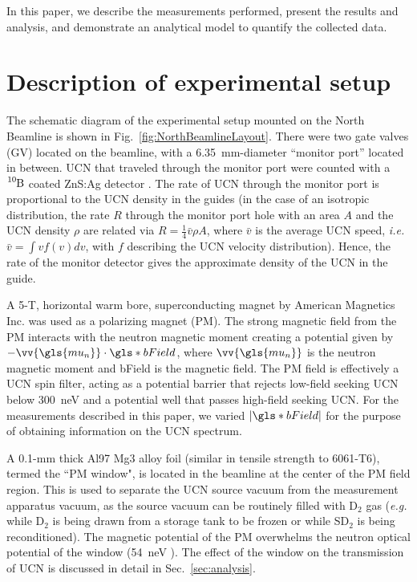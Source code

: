 In this paper, we describe the measurements performed, present the results and analysis, and demonstrate an analytical model to quantify the collected data. 


\section{\label{sec:experimentalSetup}Description of experimental setup}


The schematic diagram of the experimental setup mounted on the North Beamline is shown in Fig.~\ref{fig:NorthBeamlineLayout}. There were two gate valves (GV) located on the beamline, with a \qty{6.35}{\mm}-diameter ``monitor port'' located in between. UCN that traveled through the monitor port were counted with a $\ce{^{10}B}$ coated ZnS:Ag detector \cite{jeph_b10_2011}. The rate of UCN through the monitor port is proportional to the UCN density in the guides (in the case of an isotropic distribution, the rate $R$ through the monitor port hole with an area $A$ and the UCN density $\rho$ are related via  $R = \frac{1}{4} \bar{v} \rho A$, where $\bar{v}$ is the average UCN speed, {\it i.e.} $\bar{v} = \int vf(v)dv$, with $f$ describing the UCN velocity distribution). Hence, the rate of the monitor detector gives the approximate density of the UCN in the guide.

A 5-T, horizontal warm bore, superconducting magnet by American Magnetics Inc. was used as a polarizing magnet (PM). The strong magnetic field from the PM interacts with the neutron magnetic moment creating a potential given by $-\vv{\gls{mu_n}} \cdot \gls*{bField}$, where $\vv{\gls{mu_n}}$ is the neutron magnetic moment and \gls{bField} is the magnetic field. The PM field is effectively a UCN spin filter, acting as a potential barrier that rejects low-field seeking UCN below \qty{300}{\nano\eV} and a potential well that passes high-field seeking UCN. For the measurements described in this paper, we varied $ |\gls*{bField} |$ for the purpose of obtaining information on the UCN spectrum.

A 0.1-mm thick Al97 Mg3 alloy foil (similar in tensile strength to 6061-T6), termed the ``PM window", is located in the beamline at the center of the PM field region. This is used to separate the UCN source vacuum from the measurement apparatus vacuum, as the source vacuum can be routinely filled with D$_2$ gas ({\it e.g.} while D$_2$ is being drawn from a storage tank to be frozen or while SD$_2$ is being reconditioned). The magnetic potential of the PM overwhelms the neutron optical potential of the window (\qty{54}{\nano\eV} \cite{golubUCN}). The effect of the window on the transmission of UCN is discussed in detail in Sec.~\ref{sec:analysis}.

